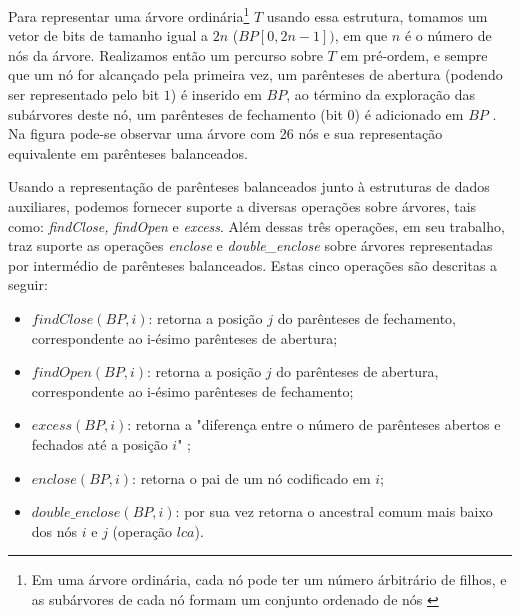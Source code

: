 Para representar uma árvore ordinária\footnote{Em uma árvore ordinária, cada nó pode ter um número árbitrário de filhos, e as subárvores de cada nó formam um conjunto ordenado de nós \citep{tenenbaum}} $T$ usando essa estrutura, tomamos um vetor de bits de tamanho igual a $2n$ ($BP[0,2n-1])$, em que $n$ é o número de nós da árvore. Realizamos então um percurso sobre $T$ em pré-ordem, e sempre que um nó for alcançado pela primeira vez, um parênteses de abertura (podendo ser representado pelo bit $1$) é inserido em $BP$, ao término da exploração das subárvores deste nó, um parênteses de fechamento (bit $0$) é adicionado em $BP$ \citep{paper-succint-trees-in-practice}.  Na figura  pode-se observar uma árvore com 26 nós e sua representação equivalente em parênteses balanceados.

Usando a representação de parênteses balanceados junto à  estruturas de dados auxiliares, podemos fornecer suporte a diversas operações sobre árvores, tais como: \textit{findClose, findOpen} e \textit{excess}. Além dessas três operações, \citet{paper-succint-representation-of-balanced-parentheses} em seu trabalho, traz suporte as operações  \textit{enclose} e \textit{double\_enclose} sobre árvores representadas por intermédio de parênteses balanceados. Estas cinco operações são descritas a seguir:

\begin{itemize}
    \item $findClose(BP,i)$: retorna a posição $j$ do parênteses de fechamento, correspondente ao i-ésimo parênteses de abertura;
    \item $findOpen(BP, i)$: retorna a posição $j$ do parênteses de abertura, correspondente ao i-ésimo parênteses de fechamento;
    \item $excess(BP, i)$: retorna a "diferença entre o número de parênteses abertos e fechados até a posição $i$"  \cite[tradução nossa]{paper-succint-representation-of-balanced-parentheses};
    \item $enclose(BP,i)$: retorna o pai de um nó codificado em $i$;
    \item $double\_enclose(BP,i)$: por sua vez retorna o ancestral comum mais baixo dos nós $i$ e $j$ (operação $lca$).
\end{itemize}

